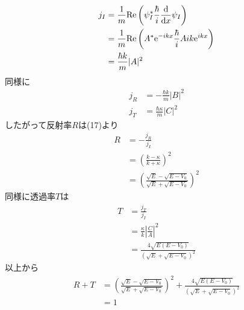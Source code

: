 \begin{align}
  j_I&=\frac{1}{m}{\rm Re}\left(\psi_I^*\frac{\hbar}{i}\frac{\rm d}{{\rm d}x}\psi_I\right)\\
  &=\frac{1}{m}{\rm Re}\left(A^*{\rm e}^{-ikx}\frac{\hbar}{i}Aik{\rm e}^{ikx}\right)\\
  &=\frac{\hbar k}{m}|A|^2
\end{align}
同様に
\begin{align}
  j_R&=-\frac{\hbar k}{m}|B|^2\\
  j_T&=\frac{\hbar \kappa}{m}|C|^2
\end{align}
したがって反射率$R$は(17)より
\begin{align}
  R&=-\frac{j_R}{j_I}\\
  &=\left(\frac{k-\kappa}{k+\kappa}\right)^2\\
  &=\left(\frac{\sqrt{E}-\sqrt{E-V_0}}{\sqrt{E}+\sqrt{E-V_0}}\right)^2\nonumber
\end{align}
同様に透過率$T$は
\begin{align}
  T&=\frac{j_T}{j_I}\\
  &=\frac{\kappa}{k}\left|\frac{C}{A}\right|^2\\
  &=\frac{4\sqrt{E(E-V_0)}}{(\sqrt{E}+\sqrt{E-V_0})^2}\nonumber
\end{align}
以上から
\begin{align*}
  R+T&=\left(\frac{\sqrt{E}-\sqrt{E-V_0}}{\sqrt{E}+\sqrt{E-V_0}}\right)^2+\frac{4\sqrt{E(E-V_0)}}{(\sqrt{E}+\sqrt{E-V_0})^2}\\
  &=1
\end{align*}
\newpage
